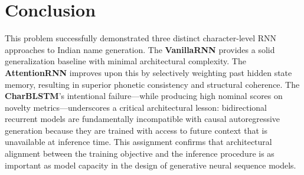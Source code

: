 \documentclass[11pt,a4paper]{article}
\begin{document}
\section{Conclusion}
This problem successfully demonstrated three distinct character-level RNN approaches to Indian name generation. The \textbf{VanillaRNN} provides a solid generalization baseline with minimal architectural complexity. The \textbf{AttentionRNN} improves upon this by selectively weighting past hidden state memory, resulting in superior phonetic consistency and structural coherence. The \textbf{CharBLSTM}'s intentional failure—while producing high nominal scores on novelty metrics—underscores a critical architectural lesson: bidirectional recurrent models are fundamentally incompatible with causal autoregressive generation because they are trained with access to future context that is unavailable at inference time. This assignment confirms that architectural alignment between the training objective and the inference procedure is as important as model capacity in the design of generative neural sequence models.
\end{document}
